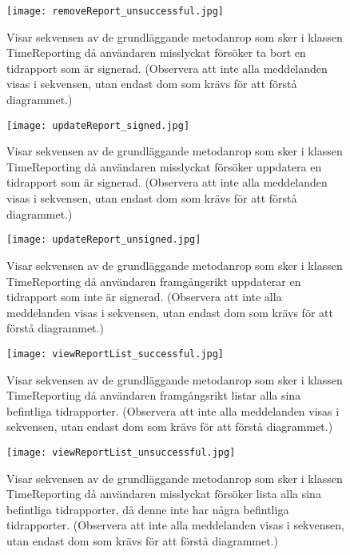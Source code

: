 \documentclass[a4paper]{article}
\begin{document}
\begin{figure}[h!]
\centering
\texttt{[image: removeReport\_unsuccessful.jpg]}
\caption{Visar sekvensen av de grundläggande metodanrop som sker i klassen TimeReporting då användaren misslyckat försöker ta bort en tidrapport som är signerad. (Observera att inte alla meddelanden visas i sekvensen, utan endast dom som krävs för att förstå diagrammet.)\label{removeReportFail}}
\end{figure}

\begin{figure}[h!]
\centering
\texttt{[image: updateReport\_signed.jpg]}
\caption{Visar sekvensen av de grundläggande metodanrop som sker i klassen TimeReporting då användaren misslyckat försöker uppdatera en tidrapport som är signerad. (Observera att inte alla meddelanden visas i sekvensen, utan endast dom som krävs för att förstå diagrammet.)\label{updateReportSigned}}
\end{figure}

\begin{figure}[h!]
\centering
\texttt{[image: updateReport\_unsigned.jpg]}
\caption{Visar sekvensen av de grundläggande metodanrop som sker i klassen TimeReporting då användaren framgångsrikt uppdaterar en tidrapport som inte är signerad. (Observera att inte alla meddelanden visas i sekvensen, utan endast dom som krävs för att förstå diagrammet.)\label{updateReportUnsigned}}
\end{figure}

\begin{figure}[h!]
\centering
\texttt{[image: viewReportList\_successful.jpg]}
\caption{Visar sekvensen av de grundläggande metodanrop som sker i klassen TimeReporting då användaren framgångsrikt listar alla sina befintliga tidrapporter. (Observera att inte alla meddelanden visas i sekvensen, utan endast dom som krävs för att förstå diagrammet.) \label{viewReportList}}
\end{figure}

\begin{figure}[h!]
\centering
\texttt{[image: viewReportList\_unsuccessful.jpg]}
\caption{Visar sekvensen av de grundläggande metodanrop som sker i klassen TimeReporting då användaren misslyckat försöker lista alla sina befintliga tidrapporter, då denne inte har några befintliga tidrapporter. (Observera att inte alla meddelanden visas i sekvensen, utan endast dom som krävs för att förstå diagrammet.) \label{viewReportListFail}}
\end{figure}
\end{document}
